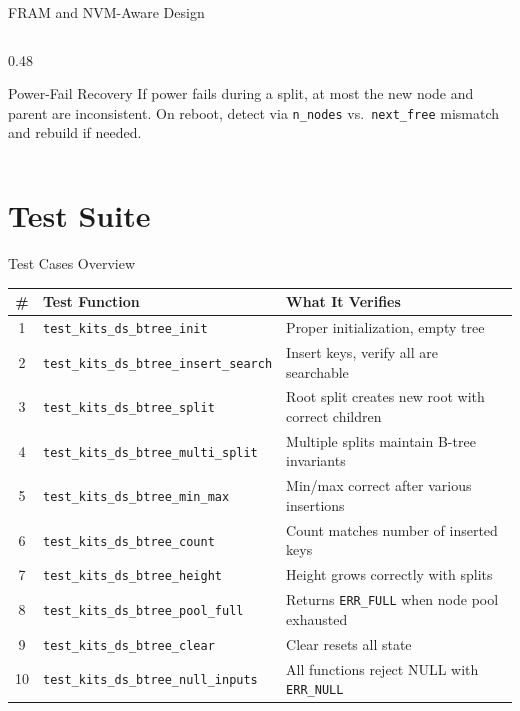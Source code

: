 \documentclass[aspectratio=169, 10pt]{beamer}
\begin{document}
\begin{frame}{FRAM and NVM-Aware Design}
\begin{columns}[T]
\begin{column}{0.48\textwidth}
\vspace{0.3em}
\begin{alertblock}{Power-Fail Recovery}
If power fails during a split, at most the new node and
parent are inconsistent. On reboot, detect via
\texttt{n\_nodes} vs.\ \texttt{next\_free} mismatch and
rebuild if needed.
\end{alertblock}
\end{column}
\end{columns}
\end{frame}

\section{Test Suite}

\begin{frame}{Test Cases Overview}
\begin{table}
\centering
\small
\begin{tabular}{@{}clp{7cm}@{}}
\toprule
\textbf{\#} & \textbf{Test Function} & \textbf{What It Verifies} \\
\midrule
1 & \texttt{test\_kits\_ds\_btree\_init}
  & Proper initialization, empty tree \\
2 & \texttt{test\_kits\_ds\_btree\_insert\_search}
  & Insert keys, verify all are searchable \\
3 & \texttt{test\_kits\_ds\_btree\_split}
  & Root split creates new root with correct children \\
4 & \texttt{test\_kits\_ds\_btree\_multi\_split}
  & Multiple splits maintain B-tree invariants \\
5 & \texttt{test\_kits\_ds\_btree\_min\_max}
  & Min/max correct after various insertions \\
6 & \texttt{test\_kits\_ds\_btree\_count}
  & Count matches number of inserted keys \\
7 & \texttt{test\_kits\_ds\_btree\_height}
  & Height grows correctly with splits \\
8 & \texttt{test\_kits\_ds\_btree\_pool\_full}
  & Returns \texttt{ERR\_FULL} when node pool exhausted \\
9 & \texttt{test\_kits\_ds\_btree\_clear}
  & Clear resets all state \\
10 & \texttt{test\_kits\_ds\_btree\_null\_inputs}
  & All functions reject NULL with \texttt{ERR\_NULL} \\
\bottomrule
\end{tabular}
\end{table}
\end{frame}
\end{document}
